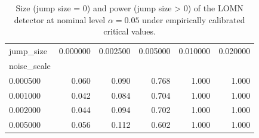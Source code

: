 \begin{table}
\caption{Size (jump size = 0) and power (jump size > 0) of the LOMN detector at nominal level $\alpha = 0.05$ under empirically calibrated critical values.}
\label{tab:size_power_calibrated}
\begin{tabular}{lrrrrr}
\toprule
jump_size & 0.000000 & 0.002500 & 0.005000 & 0.010000 & 0.020000 \\
noise_scale &  &  &  &  &  \\
\midrule
0.000500 & 0.060 & 0.090 & 0.768 & 1.000 & 1.000 \\
0.001000 & 0.042 & 0.084 & 0.704 & 1.000 & 1.000 \\
0.002000 & 0.044 & 0.094 & 0.702 & 1.000 & 1.000 \\
0.005000 & 0.056 & 0.112 & 0.602 & 1.000 & 1.000 \\
\bottomrule
\end{tabular}
\end{table}
